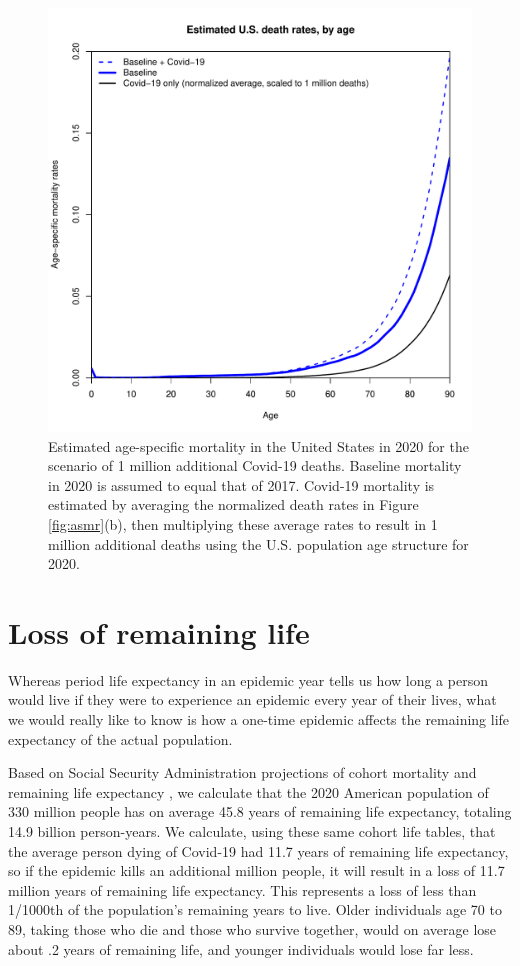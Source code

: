 \documentclass[9pt,twocolumn,twoside,lineno]{pnas-new}
\begin{document}
\begin{figure}%
\centering
\includegraphics[width=.8\linewidth]{fig3_us_rates}
\caption{Estimated age-specific mortality in the United States in 2020
  for the scenario of 1 million additional Covid-19 deaths. Baseline
  mortality in 2020 is assumed to equal that of 2017. Covid-19
  mortality is estimated by averaging the normalized death rates in
  Figure \ref{fig:asmr}(b), then multiplying these average rates to
  result in 1 million additional deaths using the U.S. population age
  structure for 2020.}
\label{fig:baseline}
\end{figure}


\section*{Loss of remaining life}

Whereas period life expectancy in an epidemic year tells us how long a
person would live if they were to experience an epidemic every year of
their lives, what we would really like to know is how a one-time
epidemic affects the remaining life expectancy of the actual
population.

Based on Social Security Administration projections of cohort
mortality and remaining life expectancy \cite{oact:2020}, we calculate
that the 2020 American population of 330 million people has on average
45.8 years of remaining life expectancy, totaling 14.9 billion
person-years. We calculate, using these same cohort life tables, that
the average person dying of Covid-19 had 11.7 years of remaining life
expectancy, so if the epidemic kills an additional million people, it
will result in a loss of 11.7 million years of remaining life
expectancy. This represents a loss of less than 1/1000th of the
population’s remaining years to live.  Older individuals age 70 to 89,
taking those who die and those who survive together, would on average
lose about .2 years of remaining life, and younger individuals would
lose far less.
\end{document}
